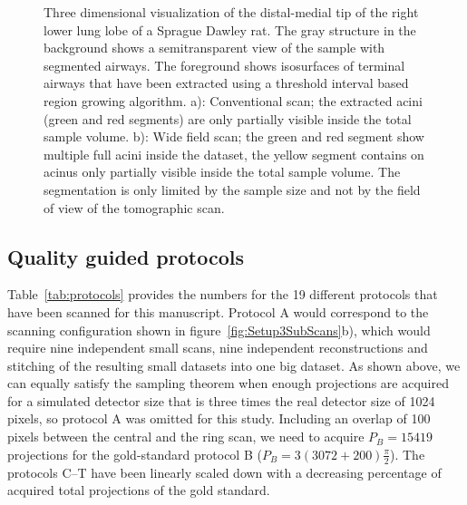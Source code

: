 \begin{figure}[htp]
{%
		}%
		\caption{Three dimensional visualization of the distal-medial tip of the right lower lung lobe of a Sprague Dawley rat. The gray structure in the background shows a semitransparent view of the sample with segmented airways. The foreground shows isosurfaces of terminal airways that have been extracted using a threshold interval based region growing algorithm. a): Conventional scan; the extracted acini (green and red segments) are only partially visible inside the total sample volume. b): Wide field scan; the green and red segment show multiple full acini inside the dataset, the yellow segment contains on acinus only partially visible inside the total sample volume. The segmentation is only limited by the sample size and not by the field of view of the tomographic scan.}%
		\label{fig:s2-wfs}%
	\end{figure}
\fi

\subsection{Quality guided protocols}%
Table~\ref{tab:protocols} provides the numbers for the 19 different protocols that have been scanned for this manuscript. Protocol A would correspond to the scanning configuration shown in figure~\ref{fig:Setup3SubScans}b), which would require nine independent small scans, nine independent reconstructions and stitching of the resulting small datasets into one big dataset. As shown above, we can equally satisfy the sampling theorem when enough projections are acquired for a simulated detector size that is three times the real detector size of 1024 pixels, so protocol A was omitted for this study. Including an overlap of 100 pixels between the central and the ring scan, we need to acquire $P_{B}=15419$ projections for the gold-standard protocol B ($P_{B}=3(3072+200)\frac{\pi}{2}$). The protocols C--T have been linearly scaled down with a decreasing percentage of acquired total projections of the gold standard.

